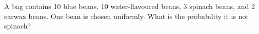 A bag contains 10 blue beans, 10 water-flavoured beans, 3 spinach beans, and 2 earwax beans. One bean is chosen uniformly. What is the probability it is not spinach?
